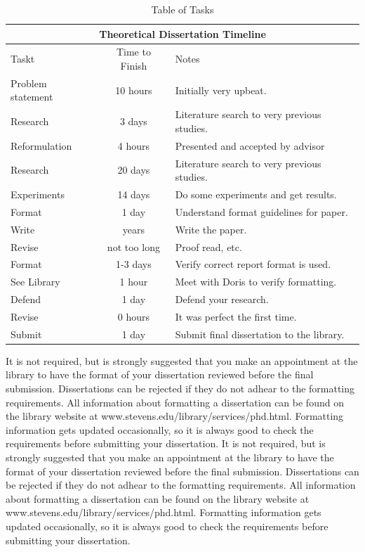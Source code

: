 \begin{table}[htp]

\begin{center}
\begin{tabular}{|l|c|p{3.0in}|}
\hline
\multicolumn{3}{|c|}{Theoretical Dissertation Timeline}\\ \hline
Taskt&Time to Finish&Notes\\ \hline
Problem statement&10 hours&Initially very upbeat.\\ \hline
Research&3 days&Literature search to very previous studies.\\ \hline
Reformulation&4 hours&Presented and accepted by advisor\\ \hline
Research&20 days&Literature search to very previous  studies.\\ \hline
Experiments&14 days&Do some experiments and get results.\\ \hline
Format&1 day&Understand format guidelines for paper.\\ \hline
Write&years&Write the paper.\\ \hline
Revise&not too long&Proof read, etc.\\ \hline
Format&1-3 days&Verify correct report format is used.\\ \hline
See Library&1 hour&Meet with Doris to verify formatting.\\ \hline
Defend&1 day&Defend your research.\\ \hline
Revise&0 hours&It was perfect the first time.\\ \hline
Submit&1 day&Submit final dissertation to the library.\\ \hline
\end{tabular}
\end{center} 

\caption{Table of Tasks}\label{fig:erptsqfit}
\end{table}
It is not required, but is strongly suggested that you make an appointment at the library to have the format of your dissertation reviewed before the final submission.  Dissertations can be rejected if they do not adhear to the formatting requirements.   
All information about formatting a dissertation can be found on the library website at www.stevens.edu/library/services/phd.html.  Formatting information gets updated occasionally, so it is always good to check the requirements before submitting your dissertation.  
It is not required, but is strongly suggested that you make an appointment at the library to have the format of your dissertation reviewed before the final submission.  Dissertations can be rejected if they do not adhear to the formatting requirements.   
All information about formatting a dissertation can be found on the library website at www.stevens.edu/library/services/phd.html.  Formatting information gets updated occasionally, so it is always good to check the requirements before submitting your dissertation.  

